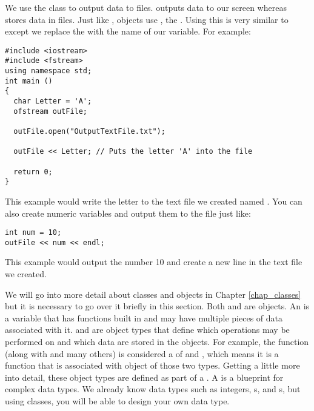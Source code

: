 
We use the  class to output data to files. 
 outputs data to our screen whereas  stores data in files. 
Just like ,  objects use \Code{<<}, the . 
Using this is very similar to  except we replace the  with the name of our variable. 
For example: \nopagebreak[4]

\noindent\begin{minipage}{\linewidth}\begin{lstlisting}		
#include <iostream> 
#include <fstream>
using namespace std;
int main ()
{
  char Letter = 'A';
  ofstream outFile;

  outFile.open("OutputTextFile.txt");

  outFile << Letter; // Puts the letter 'A' into the file

  return 0;
}
\end{lstlisting}\end{minipage}

This example would write the letter  to the text file we created named . 
You can also create numeric variables and output them to the file just like:
			
\noindent\begin{minipage}{\linewidth}\begin{lstlisting}
int num = 10;
outFile << num << endl;
\end{lstlisting}\end{minipage}		

This example would output the number 10 and create a new line in the text file we created. 

	
We will go into more detail about classes and objects in Chapter \ref{chap_classes} but it is necessary to go over it briefly in this section. 
Both  and  are objects. 
An  is a variable that has functions built in and may have multiple pieces of data associated with it. 
 and  are object types that define which operations may be performed on and which data are stored in the objects. 
For example, the function  (along with  and many others) is considered a  of  and , which means it is a function that is associated with object of those two types. 
Getting a little more into detail, these object types are defined as part of a . 
A  is a blueprint for complex data types. 
We already know data types such as integers, s, and s, but using classes, you will be able to design your own data type.

